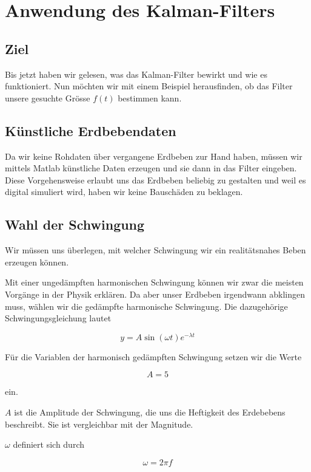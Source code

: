 \section{Anwendung des Kalman-Filters}
\subsection{Ziel}
Bis jetzt haben wir gelesen, was das Kalman-Filter bewirkt und wie es funktioniert.
Nun möchten wir mit einem Beispiel herausfinden,
ob das Filter unsere gesuchte Grösse $f(t)$ bestimmen kann.

\subsection{Künstliche Erdbebendaten}
Da wir keine Rohdaten über vergangene Erdbeben zur Hand haben, müssen wir mittels Matlab künstliche Daten erzeugen und sie dann in das Filter eingeben.
Diese Vorgehensweise erlaubt uns das Erdbeben beliebig zu gestalten
und weil es digital simuliert wird,
haben wir keine Bauschäden zu beklagen.

\subsection{Wahl der Schwingung}
Wir müssen uns überlegen, mit welcher Schwingung wir ein realitätsnahes Beben erzeugen können.

Mit einer ungedämpften harmonischen Schwingung können wir zwar die meisten Vorgänge in der Physik erklären.
Da aber unser Erdbeben irgendwann abklingen muss, wählen wir die gedämpfte harmonische Schwingung.
Die dazugehörige Schwingungsgleichung lautet

\begin{equation}
	y = A \sin(\omega t) e^{-\lambda t}
\end{equation} 

Für die Variablen der harmonisch gedämpften Schwingung setzen wir die Werte

\begin{equation}
A = 5
\end{equation} 

ein.

$A$ ist die Amplitude der Schwingung, die uns die Heftigkeit des Erdebebens beschreibt.
Sie ist vergleichbar mit der Magnitude.

$\omega$ definiert sich durch 

\begin{equation}
	\omega = 2 \pi f
\end{equation}

